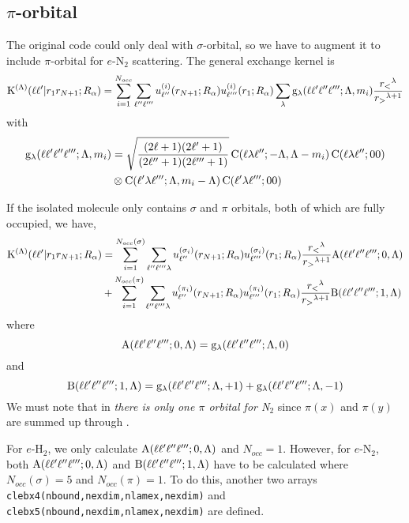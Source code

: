 \documentclass[aps,pra,groupedaddress,
                amsfonts,amssymb,
                preprint
    ]{revtex4}
\newcommand{\code}[1]{\texttt{#1}}
\begin{document}
\subsection{$\pi$-orbital}
The original code could only deal with $\sigma$-orbital, so we have to augment it to include $\pi$-orbital for $e$-N$_2$ scattering. The general exchange kernel is
\begin{equation}
  \label{eq:KEXb}
  \mathrm{K}^{(\Lambda)}(\ell\ell'|r_1r_{N+1};R_\alpha) = \sum_{i=1}^{N_{occ}}\sum_{\ell''\ell'''}
  u_{\ell''}^{(i)}(r_{N+1};R_\alpha)u_{\ell'''}^{(i)}(r_1;R_\alpha)\sum_{\lambda}\mathrm{g}_{\lambda}(\ell\ell'\ell''\ell''';\Lambda,m_i)\dfrac{r_<{}^\lambda}{r_>{}^{\lambda+1}}
\end{equation}
with
\begin{equation}
  \label{eq:glmbn}
  \begin{split}
  \mathrm{g}_{\lambda}(\ell\ell'\ell''\ell''';\Lambda,m_i) & = \sqrt{\dfrac{(2\ell+1)(2\ell'+1)}{(2\ell''+1)(2\ell'''+1)}}\,
  \mathrm{C}(\ell\lambda\ell'';-\Lambda,\Lambda-m_i)\,\mathrm{C}(\ell\lambda\ell'';00) \\
  & \otimes \mathrm{C}(\ell'\lambda\ell''';\Lambda,m_i-\Lambda)\,\mathrm{C}(\ell'\lambda\ell''';00)
  \end{split}
\end{equation}

If the isolated molecule only contains $\sigma$ and $\pi$ orbitals, both
of which are fully occupied, we have,
\begin{equation}
  \label{eq:KEXc}
  \begin{split}
  \mathrm{K}^{(\Lambda)}(\ell\ell'|r_1r_{N+1};R_\alpha) & = \sum_{i=1}^{N_{occ}(\sigma)}\sum_{\ell''\ell'''\lambda}
  u_{\ell''}^{(\sigma_i)}(r_{N+1};R_\alpha)u_{\ell'''}^{(\sigma_i)}(r_1;R_\alpha)\dfrac{r_<{}^\lambda}{r_>{}^{\lambda+1}}\mathrm{A}(\ell\ell'\ell''\ell''';0,\Lambda) \\
       & + \sum_{i=1}^{N_{occ}(\pi)}\sum_{\ell''\ell'''\lambda}
  u_{\ell''}^{(\pi_i)}(r_{N+1};R_\alpha)u_{\ell'''}^{(\pi_i)}(r_1;R_\alpha)\dfrac{r_<{}^\lambda}{r_>{}^{\lambda+1}}\mathrm{B}(\ell\ell'\ell''\ell''';1,\Lambda)
  \end{split}
\end{equation}
where
\begin{equation}
  \label{eq:Ala}
  \mathrm{A}(\ell\ell'\ell''\ell''';0,\Lambda) = \mathrm{g}_{\lambda}(\ell\ell'\ell''\ell''';\Lambda,0)
\end{equation}
and 
\begin{equation}
  \label{eq:Bla}
  \mathrm{B}(\ell\ell'\ell''\ell''';1,\Lambda) = \mathrm{g}_{\lambda}(\ell\ell'\ell''\ell''';\Lambda,+1) + \mathrm{g}_{\lambda}(\ell\ell'\ell''\ell''';\Lambda,-1)
\end{equation}
We must note that in  \textsl{there is only one $\pi$ orbital
  for N$_2$} since $\pi(x)$ and $\pi(y)$ are summed up through .

For $e$-H$_2$, we only calculate $\mathrm{A}(\ell\ell'\ell''\ell''';0,\Lambda)$ and $N_{occ}=1$.  However, for $e$-N$_2$, both $\mathrm{A}(\ell\ell'\ell''\ell''';0,\Lambda)$ and $\mathrm{B}(\ell\ell'\ell''\ell''';1,\Lambda)$ have to be calculated where $N_{occ}(\sigma)=5$ and $N_{occ}(\pi)=1$. To do this, another two arrays \code{clebx4(nbound,nexdim,nlamex,nexdim)} and \code{clebx5(nbound,nexdim,nlamex,nexdim)} are defined.
\end{document}
